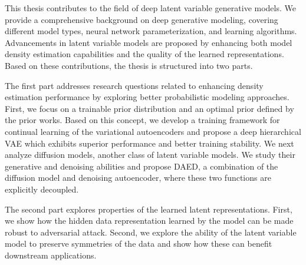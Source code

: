 \begin{abstractpage}

This thesis contributes to the field of deep latent variable generative models.
We provide a comprehensive background on deep generative modeling, covering different model types, neural network parameterization, and learning algorithms. 
Advancements in latent variable models are proposed by enhancing both model density estimation capabilities and the quality of the learned representations.
Based on these contributions, the thesis is structured into two parts. 

The first part addresses research questions related to enhancing density estimation performance by exploring better probabilistic modeling approaches. 
First, we focus on a trainable prior distribution and an optimal prior defined by the prior works. Based on this concept, we develop a training framework for continual learning of the variational autoencoders and propose a deep hierarchical VAE which exhibits superior performance and better training stability. We next analyze diffusion models, another class of latent variable models. We study their generative and denoising abilities and propose DAED, a combination of the diffusion model and denoising autoencoder, where these two functions are explicitly decoupled. 

The second part explores properties of the learned latent representations. First, we show how the hidden data representation learned by the model can be made robust to adversarial attack. Second, we explore the ability of the latent variable model to preserve symmetries of the data and show how these can benefit downstream applications.


\end{abstractpage}
